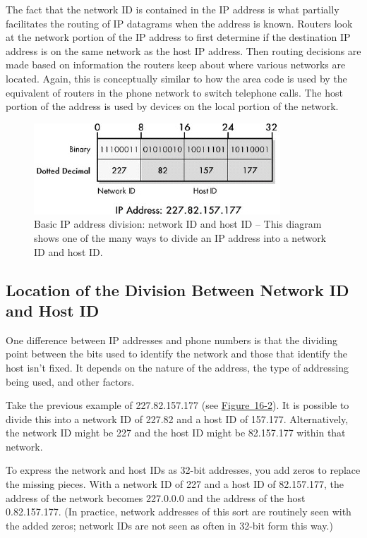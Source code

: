 \documentclass[b5paper,11pt]{memoir}
\begin{document}
The fact that the network ID is contained in the IP address is what
partially facilitates the routing of IP datagrams when the address is
known. Routers look at the network portion of the IP address to first
determine if the destination IP address is on the same network as the
host IP address. Then routing decisions are made based on information
the routers keep about where various networks are located. Again, this
is conceptually similar to how the area code is used by the equivalent
of routers in the phone network to switch telephone calls. The host
portion of the address is used by devices on the local portion of the
network.

\begin{figure}
   \centering
   \includegraphics[width=.6\textwidth]{images/ip-address-division.jpg}
   \caption{Basic IP address division: network ID and host ID -- This diagram shows one of the many ways to divide an IP address into a network ID and host ID.}
   \label{fig:ip-address-division}
\end{figure}



\subsection{Location of the Division Between Network ID and Host ID}

One difference between IP addresses and phone numbers is that the
dividing point between the bits used to identify the network and those
that identify the host isn't fixed. It depends on the nature of the
address, the type of addressing being used, and other factors.

Take the previous example of 227.82.157.177 (see
\protect\hyperlink{ch16s02.htmlux5cux23ip_address_binary_hexadecimal_and_dotted}{Figure~16-2}).
It is possible to divide this into a network ID of 227.82 and a host ID
of 157.177. Alternatively, the network ID might be 227 and the host ID
might be 82.157.177 within that network.

To express the network and host IDs as 32-bit addresses, you add zeros
to replace the missing pieces. With a network ID of 227 and a host ID of
82.157.177, the address of the network becomes 227.0.0.0 and the address
of the host 0.82.157.177. (In practice, network addresses of this sort
are routinely seen with the added zeros; network IDs are not seen as
often in 32-bit form this way.)
\end{document}
